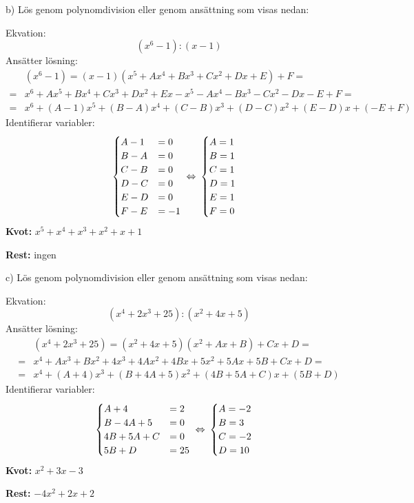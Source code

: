 \begin{task}{b)}
	Lös genom polynomdivision eller genom ansättning som visas nedan:
	
	Ekvation:
	\[(x^6-1):(x-1)\]
	Ansätter lösning:
	\begin{align*}
	&(x^6-1)=(x-1)(x^5+Ax^4+Bx^3+Cx^2+Dx+E)+F= \\ =
	&x^6+Ax^5+Bx^4+Cx^3+Dx^2+Ex-x^5-Ax^4-Bx^3-Cx^2-Dx-E+F= \\ =
	&x^6+(A-1)x^5+(B-A)x^4+(C-B)x^3+(D-C)x^2+(E-D)x+(-E+F)
	\end{align*}
	Identifierar variabler:
	\[\begin{cases}
	A-1&=0 \\
	B-A&=0 \\
	C-B&=0 \\
	D-C&=0 \\
	E-D&=0 \\
	F-E&=-1
	\end{cases}
	\lra
	\begin{cases}
	A=1 \\
	B=1 \\
	C=1 \\
	D=1 \\
	E=1 \\
	F=0
	\end{cases}\]
	\textbf{Kvot:} $x^5+x^4+x^3+x^2+x+1$
	
	\textbf{Rest:} ingen
\end{task}

\begin{task}{c)}
	Lös genom polynomdivision eller genom ansättning som visas nedan:
	
	Ekvation:
	\[(x^4+2x^3+25):(x^2+4x+5)\]
	Ansätter lösning:
	\begin{align*}
	&(x^4+2x^3+25)=(x^2+4x+5)(x^2+Ax+B)+Cx+D= \\ =
	&x^4+Ax^3+Bx^2+4x^3+4Ax^2+4Bx+5x^2+5Ax+5B+Cx+D= \\ =
	&x^4+(A+4)x^3+(B+4A+5)x^2+(4B+5A+C)x+(5B+D)
	\end{align*}
	Identifierar variabler:
	\[\begin{cases}
	A+4&=2 \\
	B-4A+5&=0 \\
	4B+5A+C&=0 \\
	5B+D&=25
	\end{cases}
	\lra
	\begin{cases}
	A=-2 \\
	B=3 \\
	C=-2 \\
	D=10
	\end{cases}\]
	\textbf{Kvot:} $x^2+3x-3$
	
	\textbf{Rest:} $-4x^2+2x+2$
\end{task}

